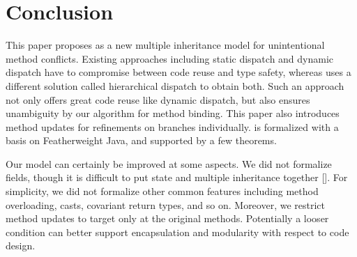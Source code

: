 \section{Conclusion}

This paper proposes \MIM{} as a new multiple inheritance model for unintentional method conflicts.
Existing approaches including static dispatch and dynamic dispatch have to compromise between code reuse
and type safety, whereas \MIM{} uses a different solution called hierarchical dispatch to obtain both.
Such an approach not only offers great code reuse like dynamic dispatch, but also ensures unambiguity by
our algorithm for method binding. This paper also introduces method updates for refinements on branches individually.
\MIM{} is formalized with a basis on Featherweight Java, and supported
by a few theorems.

Our model can certainly be improved at some aspects. We did not formalize fields, though it is difficult to
put state and multiple inheritance together []. For simplicity, we did not formalize other common features including
method overloading, casts, covariant return types, and so on. Moreover, we restrict method updates to target only at the
original methods. Potentially a looser condition can better support encapsulation and modularity with respect to code design.